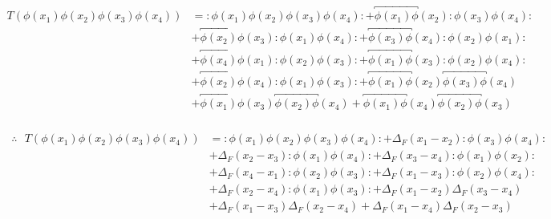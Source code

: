 \documentclass[12pt, letterpaper]{article}
\newcommand*{\1}{\hspace{1pt}}
\begin{document}
\begin{align*}
    T(\phi (x_{1})\phi (x_{2})\phi (x_{3})\phi (x_{4})) &= :\phi (x_{1})\phi (x_{2})\phi (x_{3})\phi (x_{4}): + \overbracket{\phi (x_{1})\phi} (x_{2}):\phi (x_{3})\phi (x_{4}): \\ & + \overbracket{\phi (x_{2})\phi} (x_{3}):\phi (x_{1})\phi (x_{4}): 
    + \overbracket{\phi (x_{3})\phi} (x_{4}):\phi (x_{2})\phi (x_{1}):\\ 
    & + \overbracket{\phi (x_{4})\phi} (x_{1}):\phi (x_{2})\phi (x_{3}): + \overbracket{\phi (x_{1})\phi} (x_{3}):\phi (x_{2})\phi (x_{4}): \\ 
    & + \overbracket{\phi (x_{2})\phi} (x_{4}):\phi (x_{1})\phi (x_{3}): + \overbracket{\phi (x_{1})\phi} (x_{2})\overbracket{\phi (x_{3})\phi} (x_{4}) \\
    & + \overbracket{\phi (x_{1})\phi} (x_{3})\overbracket{\phi (x_{2})\phi} (x_{4}) + \overbracket{\phi (x_{1})\phi} (x_{4})\overbracket{\phi (x_{2})\phi} (x_{3}) \\
\end{align*}

\begin{align}
\begin{split}
    \therefore \  \ \ T(\phi (x_{1})\phi (x_{2})\phi (x_{3})\phi (x_{4})) & = :\phi (x_{1})\phi (x_{2})\phi (x_{3})\phi (x_{4}): + \Delta _{F} (x_{1} - x_{2}):\phi (x_{3})\phi (x_{4}): \\ 
    & + \Delta _{F} (x_{2} - x_{3}):\phi (x_{1})\phi (x_{4}): 
    + \Delta _{F} (x_{3} - x_{4}):\phi (x_{1})\phi (x_{2}):\\ 
    & + \Delta _{F} (x_{4} - x_{1}):\phi (x_{2})\phi (x_{3}): + \Delta _{F} (x_{1} - x_{3}):\phi (x_{2})\phi (x_{4}): \\ 
    & + \Delta _{F} (x_{2} - x_{4}):\phi (x_{1})\phi (x_{3}): + \Delta _{F} (x_{1} - x_{2})\Delta _{F} (x_{3} - x_{4}) \\
    & + \Delta _{F} (x_{1} - x_{3})\Delta _{F} (x_{2} - x_{4}) + \Delta _{F} (x_{1} - x_{4})\Delta _{F} (x_{2} - x_{3})
\end{split}
\end{align}
\end{document}
